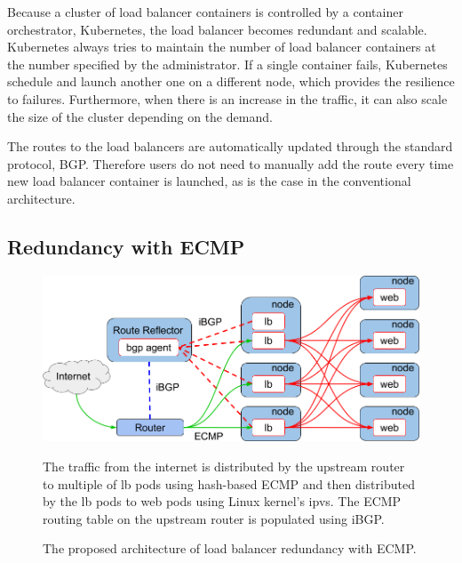 Because a cluster of load balancer containers is controlled by a container orchestrator, Kubernetes, the load balancer becomes redundant and scalable.
Kubernetes always tries to maintain the number of load balancer containers at the number specified by the administrator.
If a single container fails, Kubernetes schedule and launch another one on a different node, which provides the resilience to failures.
Furthermore, when there is an increase in the traffic, it can also scale the size of the cluster depending on the demand.

The routes to the load balancers are automatically updated through the standard protocol, BGP. 
Therefore users do not need to manually add the route every time new load balancer container is launched, as is the case in the conventional architecture.

\FloatBarrier

\subsection{Redundancy with ECMP}

\begin{figure}[tb]
  \centering
  \includegraphics[width=0.8\columnwidth]{Figs/ecmp.png}
\caption{The proposed architecture of load balancer redundancy with ECMP.}

\vspace{1mm}

\begin{minipage}{0.9\columnwidth}
  The traffic from the internet is distributed by the upstream router to multiple of lb pods using hash-based ECMP and then distributed by the lb pods to web pods using Linux kernel's ipvs.
  The ECMP routing table on the upstream router is populated using iBGP.
\end{minipage}
\label{fig:ecmp}
\end{figure}

